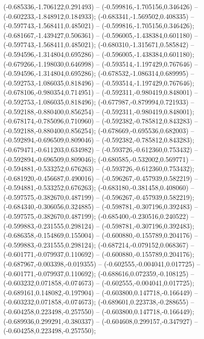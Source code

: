  (-0.685336,-1.706122,0.291493) -- (-0.599816,-1.705156,0.346426) -- (-0.602233,-1.848912,0.184933);
 (-0.683341,-1.569502,0.408335) -- (-0.597743,-1.568411,0.485021) -- (-0.599816,-1.705156,0.346426);
 (-0.681667,-1.439427,0.506361) -- (-0.596005,-1.438384,0.601180) -- (-0.597743,-1.568411,0.485021);
 (-0.680310,-1.315671,0.585842) -- (-0.594596,-1.314804,0.695286) -- (-0.596005,-1.438384,0.601180);
 (-0.679266,-1.198030,0.646998) -- (-0.593514,-1.197429,0.767646) -- (-0.594596,-1.314804,0.695286);
 (-0.678532,-1.086314,0.689995) -- (-0.592753,-1.086035,0.818496) -- (-0.593514,-1.197429,0.767646);
 (-0.678106,-0.980354,0.714951) -- (-0.592311,-0.980419,0.848001) -- (-0.592753,-1.086035,0.818496);
 (-0.677987,-0.879994,0.721933) -- (-0.592188,-0.880400,0.856254) -- (-0.592311,-0.980419,0.848001);
 (-0.678174,-0.785096,0.710960) -- (-0.592382,-0.785812,0.843283) -- (-0.592188,-0.880400,0.856254);
 (-0.678669,-0.695536,0.682003) -- (-0.592894,-0.696509,0.809046) -- (-0.592382,-0.785812,0.843283);
 (-0.679471,-0.611203,0.634982) -- (-0.593726,-0.612360,0.753432) -- (-0.592894,-0.696509,0.809046);
 (-0.680585,-0.532002,0.569771) -- (-0.594881,-0.533252,0.676263) -- (-0.593726,-0.612360,0.753432);
 (-0.681920,-0.456687,0.490016) -- (-0.596267,-0.457939,0.582219) -- (-0.594881,-0.533252,0.676263);
 (-0.683180,-0.381458,0.408060) -- (-0.597575,-0.382670,0.487199) -- (-0.596267,-0.457939,0.582219);
 (-0.684340,-0.306056,0.324885) -- (-0.598781,-0.307196,0.392483) -- (-0.597575,-0.382670,0.487199);
 (-0.685400,-0.230516,0.240522) -- (-0.599883,-0.231555,0.298124) -- (-0.598781,-0.307196,0.392483);
 (-0.686358,-0.154869,0.155004) -- (-0.600880,-0.155789,0.204176) -- (-0.599883,-0.231555,0.298124);
 (-0.687214,-0.079152,0.068367) -- (-0.601771,-0.079937,0.110692) -- (-0.600880,-0.155789,0.204176);
 (-0.687967,-0.003398,-0.019355) -- (-0.602555,-0.004041,0.017725) -- (-0.601771,-0.079937,0.110692);
 (-0.688616,0.072359,-0.108125) -- (-0.603232,0.071858,-0.074673) -- (-0.602555,-0.004041,0.017725);
 (-0.689161,0.148082,-0.197904) -- (-0.603800,0.147718,-0.166449) -- (-0.603232,0.071858,-0.074673);
 (-0.689601,0.223738,-0.288655) -- (-0.604258,0.223498,-0.257550) -- (-0.603800,0.147718,-0.166449);
 (-0.689936,0.299291,-0.380337) -- (-0.604608,0.299157,-0.347927) -- (-0.604258,0.223498,-0.257550);
